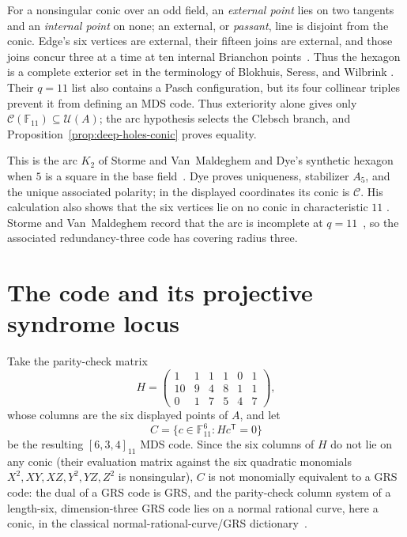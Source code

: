 \documentclass[11pt]{article}
\theoremstyle{definition}
\theoremstyle{remark}
\newcommand{\F}{\mathbb{F}}
\newcommand{\cC}{\mathcal{C}}
\newcommand{\cU}{\mathcal{U}}
\begin{document}
For a nonsingular conic over an odd field, an \emph{external point} lies on
two tangents and an \emph{internal point} on none; an external, or
\emph{passant}, line is disjoint from the conic.
Edge's six vertices are external, their fifteen joins are external, and
those joins concur three at a time at ten internal Brianchon
points~\cite[\S\S29--32]{Edge1956}. Thus the hexagon is a complete exterior
set in the terminology of Blokhuis, Seress, and Wilbrink
\cite[pp.~143,146]{BSW1992}. Their $q=11$ list also contains a Pasch
configuration, but its four collinear triples prevent it from defining an
MDS code. Thus exteriority alone gives only
$\cC(\F_{11})\subseteq\cU(A)$; the arc hypothesis selects the Clebsch
branch, and Proposition~\ref{prop:deep-holes-conic} proves equality.

This is the arc $K_2$ of Storme and Van~Maldeghem
\cite[Props.~11--12]{SVM1995} and Dye's synthetic hexagon when $5$ is a
square in the base field~\cite[Theorem~1]{Dye1991}. Dye proves uniqueness,
stabilizer $A_5$, and the unique associated polarity; in the displayed
coordinates its conic is $\cC$. His calculation also shows that the six
vertices lie on no conic in characteristic $11$
\cite[Theorem~2, pp.~277--278; p.~281]{Dye1991}. Storme and Van~Maldeghem
record that the arc is incomplete at $q=11$~\cite[Prop.~13]{SVM1995}, so the
associated redundancy-three code has covering radius three.

\section{The code and its projective syndrome locus}
\label{sec:code}

Take the parity-check matrix
\[
 H=
 \begin{pmatrix}
  1&1&1&1&0&1\\
 10&9&4&8&1&1\\
  0&1&7&5&4&7
 \end{pmatrix},
\]
whose columns are the six displayed points of $A$, and let
\[
 C=\{c\in\F_{11}^6:Hc^{\mathsf T}=0\}
\]
be the resulting $[6,3,4]_{11}$ MDS code. Since the six columns of $H$ do
not lie on any conic (their evaluation matrix against the six quadratic
monomials $X^2,XY,XZ,Y^2,YZ,Z^2$ is nonsingular), $C$ is not monomially
equivalent to a GRS code: the dual of a GRS code is GRS, and the parity-check
column system of a length-six, dimension-three GRS code lies on a normal
rational curve, here a conic, in the classical
normal-rational-curve/GRS dictionary~\cite{StormeThas1991}.
\end{document}
